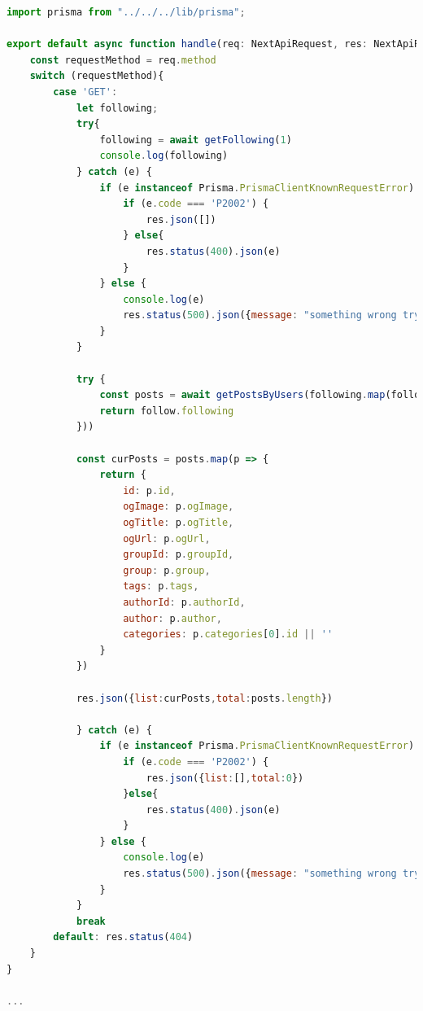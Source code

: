 \begin{lstlisting}[language=Javascript, caption=Next.js дээрээ end point гаргах, frame=single]
	import prisma from "../../../lib/prisma";

export default async function handle(req: NextApiRequest, res: NextApiResponse) {
    const requestMethod = req.method
    switch (requestMethod){
        case 'GET':
            let following;
            try{
                following = await getFollowing(1)
                console.log(following)
            } catch (e) {
                if (e instanceof Prisma.PrismaClientKnownRequestError) {
                    if (e.code === 'P2002') {
                        res.json([])
                    } else{
                        res.status(400).json(e)
                    }
                } else {
                    console.log(e)
                    res.status(500).json({message: "something wrong try again some time later"})
                }
            }

            try {
                const posts = await getPostsByUsers(following.map(follow=>{
                return follow.following
            }))
                
            const curPosts = posts.map(p => {
                return {
                    id: p.id,
                    ogImage: p.ogImage,
                    ogTitle: p.ogTitle,
                    ogUrl: p.ogUrl,
                    groupId: p.groupId,
                    group: p.group,
                    tags: p.tags,
                    authorId: p.authorId,
                    author: p.author,
                    categories: p.categories[0].id || ''
                }
            })                

            res.json({list:curPosts,total:posts.length})

            } catch (e) {
                if (e instanceof Prisma.PrismaClientKnownRequestError) {
                    if (e.code === 'P2002') {
                        res.json({list:[],total:0})
                    }else{
                        res.status(400).json(e)
                    }
                } else {
                    console.log(e)
                    res.status(500).json({message: "something wrong try again some time later"})
                }
            }
            break
        default: res.status(404)
    }
}

...

\end{lstlisting}

